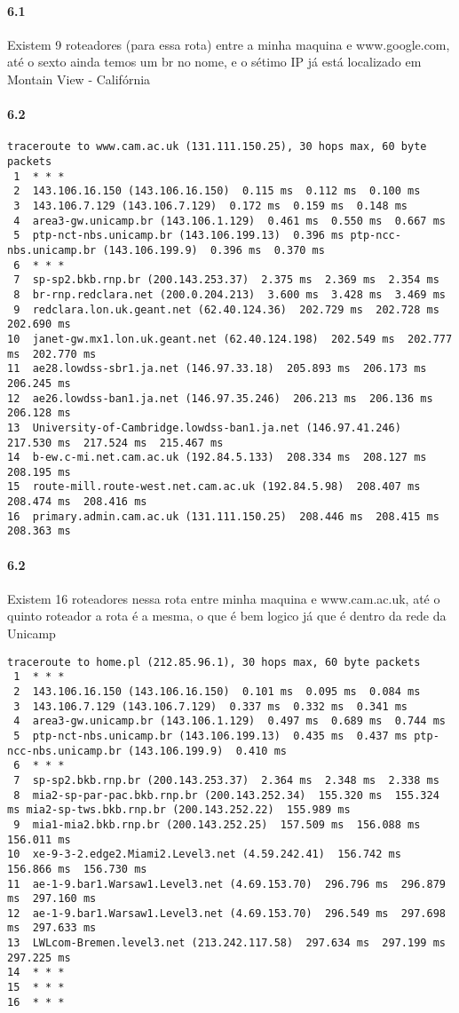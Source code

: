\documentclass{article}
\begin{document}
\paragraph{6.1} Existem 9 roteadores (para essa rota) entre a
minha maquina e www.google.com, até o sexto ainda temos um br no
nome, e o sétimo IP já está localizado em Montain View - Califórnia
\paragraph{6.2}
\begin{verbatim}
traceroute to www.cam.ac.uk (131.111.150.25), 30 hops max, 60 byte packets
 1  * * *
 2  143.106.16.150 (143.106.16.150)  0.115 ms  0.112 ms  0.100 ms
 3  143.106.7.129 (143.106.7.129)  0.172 ms  0.159 ms  0.148 ms
 4  area3-gw.unicamp.br (143.106.1.129)  0.461 ms  0.550 ms  0.667 ms
 5  ptp-nct-nbs.unicamp.br (143.106.199.13)  0.396 ms ptp-ncc-nbs.unicamp.br (143.106.199.9)  0.396 ms  0.370 ms
 6  * * *
 7  sp-sp2.bkb.rnp.br (200.143.253.37)  2.375 ms  2.369 ms  2.354 ms
 8  br-rnp.redclara.net (200.0.204.213)  3.600 ms  3.428 ms  3.469 ms
 9  redclara.lon.uk.geant.net (62.40.124.36)  202.729 ms  202.728 ms  202.690 ms
10  janet-gw.mx1.lon.uk.geant.net (62.40.124.198)  202.549 ms  202.777 ms  202.770 ms
11  ae28.lowdss-sbr1.ja.net (146.97.33.18)  205.893 ms  206.173 ms  206.245 ms
12  ae26.lowdss-ban1.ja.net (146.97.35.246)  206.213 ms  206.136 ms  206.128 ms
13  University-of-Cambridge.lowdss-ban1.ja.net (146.97.41.246)  217.530 ms  217.524 ms  215.467 ms
14  b-ew.c-mi.net.cam.ac.uk (192.84.5.133)  208.334 ms  208.127 ms  208.195 ms
15  route-mill.route-west.net.cam.ac.uk (192.84.5.98)  208.407 ms  208.474 ms  208.416 ms
16  primary.admin.cam.ac.uk (131.111.150.25)  208.446 ms  208.415 ms  208.363 ms
\end{verbatim}
\paragraph{6.2} Existem 16 roteadores nessa rota entre minha
maquina e www.cam.ac.uk, até o quinto roteador a rota é a mesma,
o que é bem logico já que é dentro da rede da Unicamp
\begin{verbatim}
traceroute to home.pl (212.85.96.1), 30 hops max, 60 byte packets
 1  * * *
 2  143.106.16.150 (143.106.16.150)  0.101 ms  0.095 ms  0.084 ms
 3  143.106.7.129 (143.106.7.129)  0.337 ms  0.332 ms  0.341 ms
 4  area3-gw.unicamp.br (143.106.1.129)  0.497 ms  0.689 ms  0.744 ms
 5  ptp-nct-nbs.unicamp.br (143.106.199.13)  0.435 ms  0.437 ms ptp-ncc-nbs.unicamp.br (143.106.199.9)  0.410 ms
 6  * * *
 7  sp-sp2.bkb.rnp.br (200.143.253.37)  2.364 ms  2.348 ms  2.338 ms
 8  mia2-sp-par-pac.bkb.rnp.br (200.143.252.34)  155.320 ms  155.324 ms mia2-sp-tws.bkb.rnp.br (200.143.252.22)  155.989 ms
 9  mia1-mia2.bkb.rnp.br (200.143.252.25)  157.509 ms  156.088 ms  156.011 ms
10  xe-9-3-2.edge2.Miami2.Level3.net (4.59.242.41)  156.742 ms  156.866 ms  156.730 ms
11  ae-1-9.bar1.Warsaw1.Level3.net (4.69.153.70)  296.796 ms  296.879 ms  297.160 ms
12  ae-1-9.bar1.Warsaw1.Level3.net (4.69.153.70)  296.549 ms  297.698 ms  297.633 ms
13  LWLcom-Bremen.level3.net (213.242.117.58)  297.634 ms  297.199 ms  297.225 ms
14  * * *
15  * * *
16  * * *
\end{verbatim}
\end{document}
